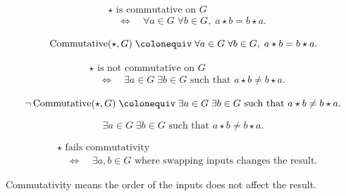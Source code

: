 \begin{remark*}
\[
\begin{aligned}
&\star \text{ is commutative on } G \\
&\quad\Longleftrightarrow\quad
\forall a \in G\;\forall b \in G,\; a \star b = b \star a.
\end{aligned}
\]
\end{remark*}

\begin{remark*}
\[
\operatorname{Commutative}(\star, G)
\;\colonequiv\;
\forall a \in G\;\forall b \in G,\; a \star b = b \star a.
\]
\end{remark*}

\begin{remark*}
\[
\begin{aligned}
&\star \text{ is not commutative on } G \\
&\quad\Longleftrightarrow\quad
\exists a \in G\;\exists b \in G \text{ such that } a \star b \ne b \star a.
\end{aligned}
\]
\end{remark*}

\begin{remark*}
\[
\neg \operatorname{Commutative}(\star, G)
\;\colonequiv\;
\exists a \in G\;\exists b \in G \text{ such that } a \star b \ne b \star a.
\]
\end{remark*}

\begin{remark*}
\[
\exists a \in G\;\exists b \in G \text{ such that } a \star b \ne b \star a.
\]
\end{remark*}

\begin{remark*}
\[
\begin{aligned}
&\star \text{ fails commutativity} \\
&\quad\Longleftrightarrow\quad
\exists a,b \in G \text{ where swapping inputs changes the result.}
\end{aligned}
\]
\end{remark*}

\begin{remark*}[Interpretation]
Commutativity means the order of the inputs does not affect the result.
\end{remark*}


